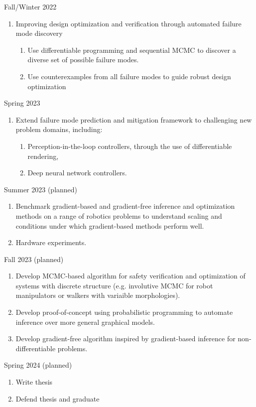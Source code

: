 Fall/Winter 2022
\begin{enumerate}
    \item Improving design optimization and verification through automated failure mode discovery
          \begin{enumerate}
              \item Use differentiable programming and sequential MCMC to discover a diverse set of possible failure modes.
              \item Use counterexamples from all failure modes to guide robust design optimization
          \end{enumerate}
\end{enumerate}

Spring 2023
\begin{enumerate}
    \item Extend failure mode prediction and mitigation framework to challenging new problem domains, including:
          \begin{enumerate}
              \item Perception-in-the-loop controllers, through the use of differentiable rendering,
              \item Deep neural network controllers.
          \end{enumerate}
\end{enumerate}

Summer 2023 (planned)
\begin{enumerate}
    \item Benchmark gradient-based and gradient-free inference and optimization methods on a range of robotics problems to understand scaling and conditions under which gradient-based methods perform well.
    \item Hardware experiments.
\end{enumerate}

Fall 2023 (planned)
\begin{enumerate}
    \item Develop MCMC-based algorithm for safety verification and optimization of systems with discrete structure (e.g. involutive MCMC for robot manipulators or walkers with variaible morphologies).
    \item Develop proof-of-concept using probabilistic programming to automate inference over more general graphical models.
    \item Develop gradient-free algorithm inspired by gradient-based inference for non-differentiable problems.
\end{enumerate}

Spring 2024 (planned)
\begin{enumerate}
    \item Write thesis
    \item Defend thesis and graduate
\end{enumerate}
